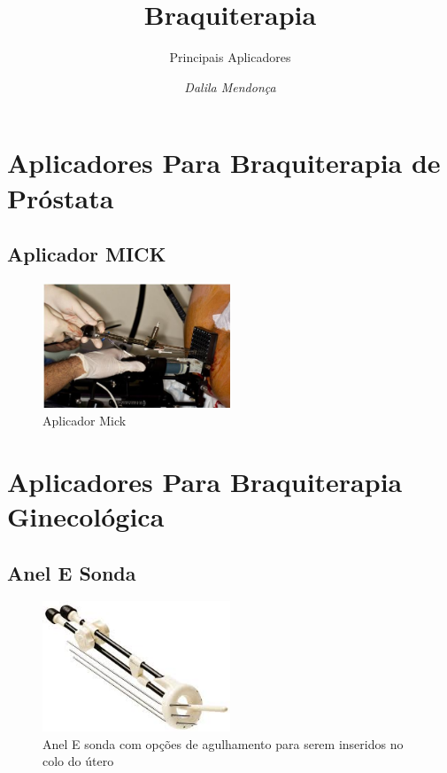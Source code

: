 \documentclass[11pt,a4paper]{article}
\title{Braquiterapia}
\author{Principais Aplicadores\nocite{*}}
\date{\textit{Dalila Mendonça}}
\begin{document}
	\maketitle

    \section{Aplicadores Para Braquiterapia de Próstata}

        \subsection{Aplicador MICK}

            \begin{figure}[h]
                \centering
                \includegraphics[width=0.5\textwidth]{Imagens/aplicadorMick.JPG}
                \caption{Aplicador Mick}
            \end{figure}

    \pagebreak
    \section{Aplicadores Para Braquiterapia Ginecológica}

        \subsection{Anel E Sonda}

            \begin{figure}[h]
                \centering
                \includegraphics[width=0.5\textwidth]{Imagens/aplicadorAnelESonda.jpg}
                \caption{Anel E sonda com opções de agulhamento para serem inseridos no colo do útero}
            \end{figure}
        
\end{document}
